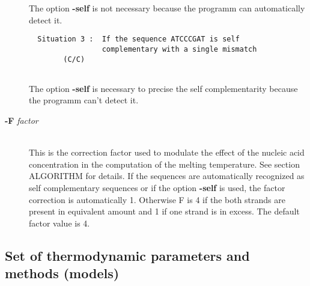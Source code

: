 \documentclass{article}
\begin{document}
\begin{description}
\begin{verbatim}
  \end{verbatim}
    
  The option \textbf{-self} is not necessary because the programm 
  can automatically detect it.
  
  \begin{verbatim}  
  Situation 3 :  If the sequence ATCCCGAT is self 
                 complementary with a single mismatch 
		(C/C)
      
  \end{verbatim}
  		 
  The option \textbf{-self} is necessary to precise the self 
  complementarity because the programm can't detect it.
      
 \item [\textbf{-F} \textit{factor}  ]\mbox{}\\
  This is the correction factor used to modulate the effect of the nucleic acid concentration in the computation of the melting temperature. 
  See section ALGORITHM for details. If the sequences are automatically recognized as self complementary sequences or if the option \textbf{-self}
  is used, the factor correction is automatically 1. Otherwise F is 4 if the both strands are present in equivalent amount and 1 if one strand is in excess. 
  The default factor value is 4.
\end{description}

\subsection{Set of thermodynamic parameters and methods (models)}
\end{document}
